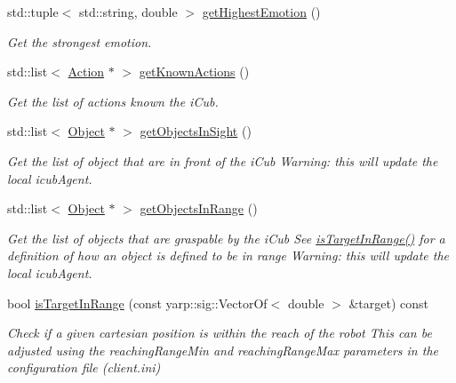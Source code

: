 \begin{DoxyCompactItemize}
std\+::tuple$<$ std\+::string, double $>$ \hyperlink{group__icubclient__clients_a121c1d28c4b6f8c8cec80f4216dfb30c}{get\+Highest\+Emotion} ()
\begin{DoxyCompactList}\small\item\em Get the strongest emotion. \end{DoxyCompactList}\item 
std\+::list$<$ \hyperlink{group__icubclient__representations_classicubclient_1_1Action}{Action} $\ast$ $>$ \hyperlink{group__icubclient__clients_ad50cd8953af1f4c418e79c2319a6ce44}{get\+Known\+Actions} ()
\begin{DoxyCompactList}\small\item\em Get the list of actions known the i\+Cub. \end{DoxyCompactList}\item 
std\+::list$<$ \hyperlink{group__icubclient__representations_classicubclient_1_1Object}{Object} $\ast$ $>$ \hyperlink{group__icubclient__clients_aadf74f6b99e053bedc3665a41c04f89b}{get\+Objects\+In\+Sight} ()
\begin{DoxyCompactList}\small\item\em Get the list of object that are in front of the i\+Cub Warning\+: this will update the local icub\+Agent. \end{DoxyCompactList}\item 
std\+::list$<$ \hyperlink{group__icubclient__representations_classicubclient_1_1Object}{Object} $\ast$ $>$ \hyperlink{group__icubclient__clients_ab6f337af95d90108deb4c12530bccec0}{get\+Objects\+In\+Range} ()
\begin{DoxyCompactList}\small\item\em Get the list of objects that are graspable by the i\+Cub See \hyperlink{group__icubclient__clients_ae2c6388e184ee5f8feeb5c79901f32d5}{is\+Target\+In\+Range()} for a definition of how an object is defined to be in range Warning\+: this will update the local icub\+Agent. \end{DoxyCompactList}\item 
bool \hyperlink{group__icubclient__clients_ae2c6388e184ee5f8feeb5c79901f32d5}{is\+Target\+In\+Range} (const yarp\+::sig\+::\+Vector\+Of$<$ double $>$ \&target) const
\begin{DoxyCompactList}\small\item\em Check if a given cartesian position is within the reach of the robot This can be adjusted using the reaching\+Range\+Min and reaching\+Range\+Max parameters in the configuration file (client.\+ini) \end{DoxyCompactList}\item 

\end{DoxyCompactItemize}
